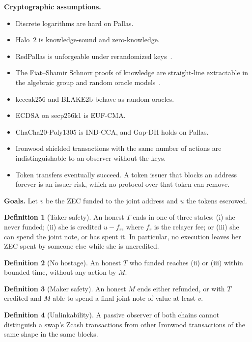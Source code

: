 \documentclass[10pt,letterpaper]{article}
\theoremstyle{plain}
\theoremstyle{definition}
\newtheorem{definition}{Definition}
\begin{document}
\textbf{Cryptographic assumptions.}
\begin{itemize}\setlength\itemsep{0.05em}
\item Discrete logarithms are hard on Pallas.
\item Halo~2 is knowledge-sound and zero-knowledge.
\item RedPallas is unforgeable under rerandomized keys~\cite{spec,rerandfrost}.
\item The Fiat--Shamir Schnorr proofs of knowledge are straight-line extractable in the
algebraic group and random oracle models~\cite{agm}.
\item keccak256 and BLAKE2b behave as random oracles.
\item ECDSA on secp256k1 is EUF-CMA.
\item ChaCha20-Poly1305 is IND-CCA, and Gap-DH holds on Pallas.
\item Ironwood shielded transactions with the same number of actions are indistinguishable to an
observer without the keys.
\item Token transfers eventually succeed. A token issuer that blocks an address forever is an
issuer risk, which no protocol over that token can remove.
\end{itemize}

\textbf{Goals.} Let $v$ be the ZEC funded to the joint address and $u$ the tokens escrowed.
\begin{definition}[Taker safety]
An honest $T$ ends in one of three states: (i) she never funded; (ii) she is credited
$u - f_r$, where $f_r$ is the relayer fee; or (iii) she can spend the joint note, or has spent
it. In particular, no execution leaves her ZEC spent by someone else while she is uncredited.
\end{definition}
\begin{definition}[No hostage]
An honest $T$ who funded reaches (ii) or (iii) within bounded time, without any action by $M$.
\end{definition}
\begin{definition}[Maker safety]
An honest $M$ ends either refunded, or with $T$ credited and $M$ able to spend a final joint
note of value at least $v$.
\end{definition}
\begin{definition}[Unlinkability]
A passive observer of both chains cannot distinguish a swap's Zcash transactions from other
Ironwood transactions of the same shape in the same blocks.
\end{definition}
\end{document}
